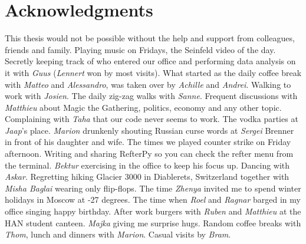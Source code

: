 \manualmark
{}%
%
%
\chapter*{Acknowledgments}%

This thesis would not be possible without the help and support from colleagues, friends and family. Playing music on Fridays, the Seinfeld video of the day. Secretly keeping track of who entered our office and performing data analysis on it with \emph{Guus} (\emph{Lennert} won by most visits). What started as the daily coffee break with \emph{Matteo} and \emph{Alessandro}, was taken over by \emph{Achille} and \emph{Andrei}. Walking to work with \emph{Josien}. The daily zig-zag walks with \emph{Sanne}. Frequent discussions with \emph{Matthieu} about Magic the Gathering, politics, economy and any other topic. Complaining with \emph{Taha} that our code never seems to work.
The vodka parties at \emph{Jaap}'s place. \emph{Marion} drunkenly shouting Russian curse words at \emph{Sergei} Brenner in front of his daughter and wife. The times we played counter strike on Friday afternoon. 
Writing and sharing RefterPy so you can check the refter menu from the terminal. \emph{Bektur} exercising in the office to keep his focus up. Dancing with \emph{Askar}. Regretting hiking Glacier 3000 in Diablerets, Switzerland together with \emph{Misha Baglai} wearing only flip-flops. The time \emph{Zhenya} invited me to spend winter holidays in Moscow at -27 degrees. The time when \emph{Roel} and \emph{Ragnar} barged in my office singing happy birthday. After work burgers with \emph{Ruben} and \emph{Matthieu} at the HAN student canteen. \emph{Majka} giving me surprise hugs. Random coffee breaks with \emph{Thom}, lunch and dinners with \emph{Marion}. Casual visits by \emph{Bram}. %
